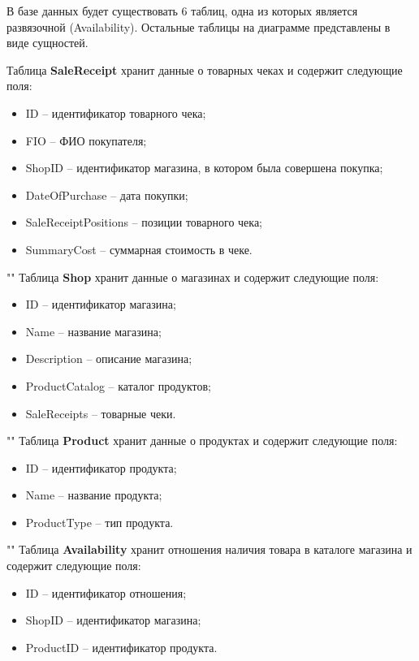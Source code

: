 \documentclass[a4paper,14pt]{extreport}
\begin{document}
В базе данных будет существовать 6 таблиц, одна из которых является развязочной (Availability). Остальные таблицы на диаграмме представлены в виде сущностей.

Таблица \textbf{SaleReceipt} хранит данные о товарных чеках и содержит следующие поля:
\begin{itemize}
	\setlength\itemsep{0.01em}
	\item ID -- идентификатор товарного чека;
	\item FIO -- ФИО покупателя;
	\item ShopID -- идентификатор магазина, в котором была совершена покупка;
	\item DateOfPurchase -- дата покупки;
	\item SaleReceiptPositions -- позиции товарного чека;
	\item SummaryCost -- суммарная стоимость в чеке.
\end{itemize}

""\newline\indent
Таблица \textbf{Shop} хранит данные о магазинах и содержит следующие поля:
\begin{itemize}
	\setlength\itemsep{0.01em}
	\item ID -- идентификатор магазина;
	\item Name -- название магазина;
	\item Description -- описание магазина;
	\item ProductCatalog -- каталог продуктов;
	\item SaleReceipts -- товарные чеки.
\end{itemize}

""\newline\indent
Таблица \textbf{Product} хранит данные о продуктах и содержит следующие поля:
\begin{itemize}
	\setlength\itemsep{0.01em}
	\item ID -- идентификатор продукта;
	\item Name -- название продукта;
	\item ProductType -- тип продукта.
\end{itemize}

""\newline\indent
Таблица \textbf{Availability} хранит отношения наличия товара в каталоге магазина и содержит следующие поля:
\begin{itemize}
	\setlength\itemsep{0.01em}
	\item ID -- идентификатор отношения;
	\item ShopID -- идентификатор магазина;
	\item ProductID -- идентификатор продукта.
\end{itemize}
\end{document}
